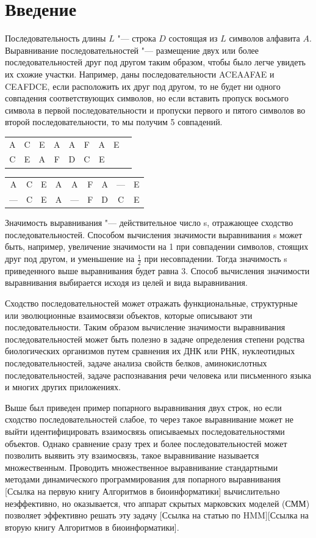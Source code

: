 \documentclass[]{article}
\begin{document}
	\section{Введение}
		Последовательность длины $L$ "--- строка $D$ состоящая из $L$ символов алфавита $A$. Выравнивание последовательностей  "--- размещение двух или более последовательностей друг под другом таким образом, чтобы было легче увидеть их схожие участки. Например, даны последовательности ACEAAFAE и CEAFDCE, если расположить их друг под другом, то не будет ни одного совпадения соответствующих символов, но если вставить пропуск восьмого символа в первой последовательности и пропуски первого и пятого символов во второй последовательности, то мы получим 5 совпадений.
		\begin{center}
			\begin{tabular}{ccccccccc}
				A&C&E&A&A&F&A&E\\
				C&E&A&F&D&C&E\\
			\end{tabular}
		\end{center}
		\begin{center}
			\begin{tabular}{ccccccccc}
				A&C&E&A&A&F&A&—&E\\
				—&C&E&A&—&F&D&C&E\\
			\end{tabular}
		\end{center}
		Значимость выравнивания "--- действительное число s, отражающее сходство последовательностей. Способом вычисления значимости выравнивания s может быть, например, увеличение значимости на 1 при совпадении символов, стоящих друг под другом, и уменьшение на $\frac{1}{2}$ при несовпадении. Тогда значимость s приведенного выше выравнивания будет равна 3. Способ вычисления значимости выравнивания выбирается исходя из целей и вида выравнивания.
		
		Сходство последовательностей может отражать функциональные, структурные или эволюционные взаимосвязи объектов, которые описывают эти последовательности. Таким образом вычисление значимости выравнивания последовательностей может быть полезно в задаче определения степени родства биологических организмов путем сравнения их ДНК или РНК, нуклеотидных последовательностей, задаче анализа свойств белков, аминокислотных последовательностей, задаче распознавания речи человека или письменного языка и многих других приложениях.
		
		Выше был приведен пример попарного выравнивания двух строк, но если сходство последовательностей слабое, то через такое выравнивание может не выйти идентифицировать взаимосвязь описываемых последовательностями объектов. Однако сравнение сразу трех и более последовательностей может позволить выявить эту взаимосвязь, такое выравнивание называется множественным. Проводить множественное выравнивание стандартными методами динамического программирования для попарного выравнивания [Ссылка на первую книгу Алгоритмов в биоинформатики] вычислительно неэффективно, но оказывается, что аппарат скрытых марковских моделей (СММ) позволяет эффективно решать эту задачу [Ссылка на статью по HMM][Ссылка на вторую книгу Алгоритмов в биоинформатики]. 
		
\end{document}
